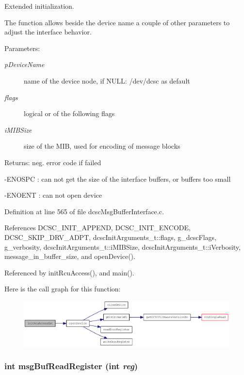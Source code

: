 Extended initialization. 

The function allows beside the device name a couple of other parameters to adjust the interface behavior. \begin{Desc}
\item[Parameters:]
\begin{description}
\item[{\em p\-Device\-Name}]name of the device node, if NULL: /dev/dcsc as default \item[{\em flags}]logical or of the following flags \item[{\em i\-MIBSize}]size of the MIB, used for encoding of message blocks \end{description}
\end{Desc}
\begin{Desc}
\item[Returns:]neg. error code if failed\par
 -ENOSPC : can not get the size of the interface buffers, or buffers too small\par
 -ENOENT : can not open device \end{Desc}


Definition at line 565 of file dcsc\-Msg\-Buffer\-Interface.c.

References DCSC\_\-INIT\_\-APPEND, DCSC\_\-INIT\_\-ENCODE, DCSC\_\-SKIP\_\-DRV\_\-ADPT, dcsc\-Init\-Arguments\_\-t::flags, g\_\-dcsc\-Flags, g\_\-verbosity, dcsc\-Init\-Arguments\_\-t::i\-MIBSize, dcsc\-Init\-Arguments\_\-t::i\-Verbosity, message\_\-in\_\-buffer\_\-size, and open\-Device().

Referenced by init\-Rcu\-Access(), and main().

Here is the call graph for this function:\begin{figure}[H]
\begin{center}
\leavevmode
\includegraphics[width=351pt]{group__dcsc__msg__buffer__access_g95f13464dd4da9231a53e7adbb0e7d4e_cgraph}
\end{center}
\end{figure}
\hypertarget{group__dcsc__msg__buffer__access_g7a5b0d57fbd0a68206468a01b0a63520}{
\subsubsection[msgBufReadRegister]{\setlength{\rightskip}{0pt plus 5cm}int msg\-Buf\-Read\-Register (int {\em reg})}}
\label{group__dcsc__msg__buffer__access_g7a5b0d57fbd0a68206468a01b0a63520}


